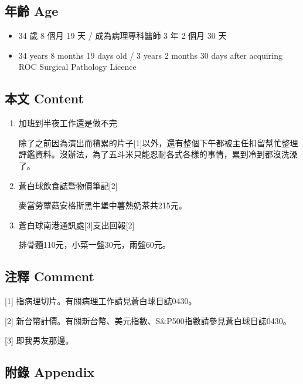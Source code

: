 \documentclass[a5paper, 10pt
]{book}
\providecommand{\tightlist}{%
  \setlength{\itemsep}{0pt}\setlength{\parskip}{0pt}}
\begin{document}
\hypertarget{ux5e74ux9f61-age-41}{%
\subsection{年齡 Age}\label{ux5e74ux9f61-age-41}}

\begin{itemize}
\tightlist
\item
  34 歲 8 個月 19 天 / 成為病理專科醫師 3 年 2 個月 30 天
\item
  34 years 8 months 19 days old / 3 years 2 months 30 days after
  acquiring ROC Surgical Pathology Licence
\end{itemize}

\hypertarget{ux672cux6587-content-41}{%
\subsection{本文 Content}\label{ux672cux6587-content-41}}

\begin{enumerate}
\def\labelenumi{\arabic{enumi}.}
\item
  加班到半夜工作還是做不完

  除了之前因為演出而積累的片子{[}1{]}以外，還有整個下午都被主任扣留幫忙整理評鑑資料。沒辦法，為了五斗米只能忍耐各式各樣的事情，累到冷到都沒洗澡了。
\item
  蒼白球飲食誌暨物價筆記{[}2{]}

  麥當勞蕈菇安格斯黑牛堡中薯熱奶茶共215元。
\item
  蒼白球南港通訊處{[}3{]}支出回報{[}2{]}

  排骨麵110元，小菜一盤30元，兩盤60元。
\end{enumerate}

\hypertarget{ux6ce8ux91cb-comment-41}{%
\subsection{注釋 Comment}\label{ux6ce8ux91cb-comment-41}}

{[}1{]} 指病理切片。有關病理工作請見蒼白球日誌0430。

{[}2{]}
新台幣計價。有關新台幣、美元指數、S\&P500指數請參見蒼白球日誌0430。

{[}3{]} 即我男友那邊。

\hypertarget{ux9644ux9304-appendix-41}{%
\subsection{附錄 Appendix}\label{ux9644ux9304-appendix-41}}
\end{document}
